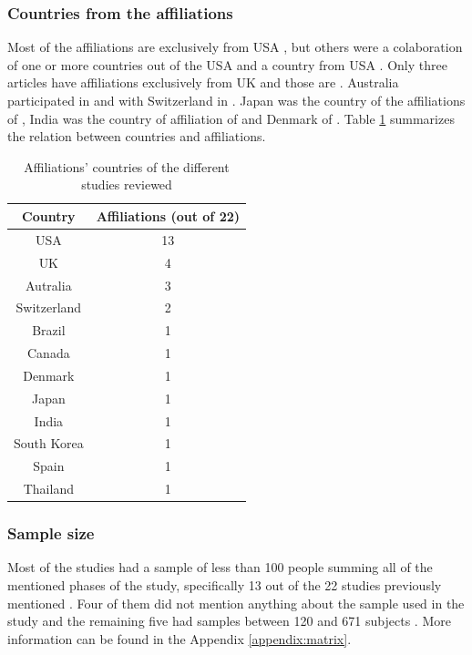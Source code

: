 \subsubsection{Countries from the affiliations}

Most of the affiliations are exclusively from USA \cite{Li2021,Mitchell2020297,Businelle2020,Suffoletto2020505,Killian201935,Willoughby2019496,Mariakakis2018,Suffoletto2018116,Leonard2017,Kinnamon2017}, but others were a colaboration of one or more countries out of the USA and a country from USA \cite{Sempionatto2019161,Bertholet2017285,Park201774}. Only three articles have affiliations exclusively from UK and those are \cite{Leightley2020,Garnett2019296,Leightley2018}. Australia participated in \cite{Poulton201835} and with Switzerland in \cite{Phan2020211}. Japan was the country of the affiliations of \cite{Wakana2019}, India was the country of affiliation of \cite{Chatterjee2018} and Denmark of \cite{Mellentin2017}. Table \ref{countries} summarizes the relation between countries and affiliations.

\begin{table}[h!]
  \centering
 \begin{tabular}{|| c | c ||}
 \hline
 \textbf{Country} & \textbf{Affiliations (out of 22)} \\ [0.5ex]
 \hline\hline
 USA & 13\\
 \hline
 UK & 4\\
 \hline
 Autralia & 3\\
 \hline
 Switzerland &  2\\
 \hline
 Brazil & 1\\
 \hline
 Canada & 1\\
 \hline
 Denmark & 1\\
 \hline
 Japan & 1\\
 \hline
 India & 1\\
 \hline
 South Korea & 1\\
 \hline
 Spain & 1\\
 \hline
 Thailand & 1\\ [0.5ex]
 \hline
\end{tabular}
\caption{Affiliations' countries of the different studies reviewed}
\label{countries}
\end{table}

\subsubsection{Sample size}

Most of the studies had a sample of less than 100 people summing all of the mentioned phases of the study, specifically 13 out of the 22 studies previously mentioned \cite{Li2021,Intarasirisawat2020,Mitchell2020297,Suffoletto2020505,Leightley2020,Killian201935,Sempionatto2019161,Leightley2018,Mariakakis2018,Suffoletto2018116,Leonard2017,Mellentin2017,Park201774}. Four of them \cite{Wakana2019,Garnett2019296,Chatterjee2018,Kinnamon2017} did not mention anything about the sample used in the study and the remaining five had samples between 120 and 671 subjects \cite{Phan2020211,Businelle2020,Willoughby2019496,Poulton201835,Bertholet2017285}. More information can be found in the Appendix \ref{appendix:matrix}.

